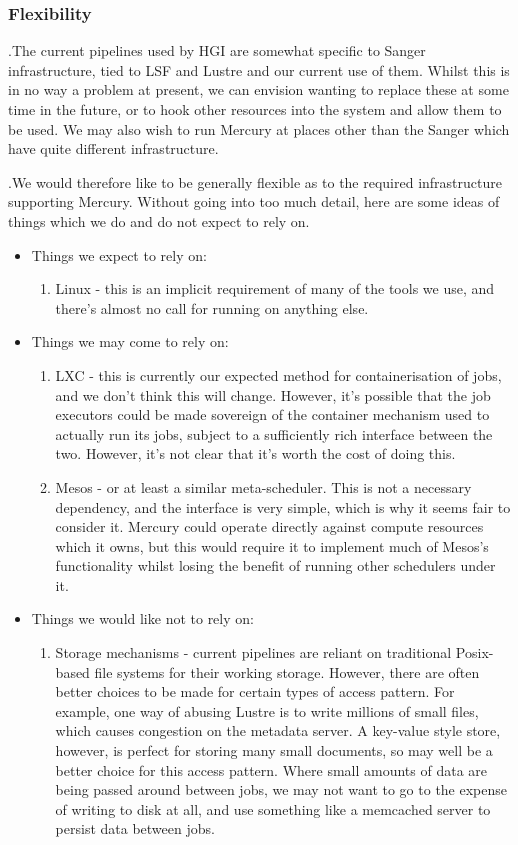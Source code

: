 \documentclass[10pt,a4paper]{article}
\newcounter{paracounter}
\newcommand{\npar}{\par\noindent\refstepcounter{paracounter}\theparacounter.\space}
\begin{document}
\subsubsection{Flexibility}
\label{sec:flexibility}
\npar The current pipelines used by HGI are somewhat specific to Sanger infrastructure, tied to LSF and Lustre and our current use of them. Whilst this is in no way a problem at present, we can envision wanting to replace these at some time in the future, or to hook other resources into the system and allow them to be used. We may also wish to run Mercury at places other than the Sanger which have quite different infrastructure.
\npar We would therefore like to be generally flexible as to the required infrastructure supporting Mercury. Without going into too much detail, here are some ideas of things which we do and do not expect to rely on.
\begin{itemize}
\item Things we expect to rely on:
\begin{enumerate}
\item Linux - this is an implicit requirement of many of the tools we use, and there's almost no call for running on anything else.
\end{enumerate}
\item Things we may come to rely on:
\begin{enumerate}
\item LXC - this is currently our expected method for containerisation of jobs, and we don't think this will change. However, it's possible that the \glspl{job executor} could be made sovereign of the container mechanism used to actually run its jobs, subject to a sufficiently rich interface between the two. However, it's not clear that it's worth the cost of doing this.
\item Mesos - or at least a similar meta-scheduler. This is not a necessary dependency, and the interface is very simple, which is why it seems fair to consider it. Mercury could operate directly against compute resources which it owns, but this would require it to implement much of Mesos's functionality whilst losing the benefit of running other schedulers under it.
\end{enumerate}
\item Things we would like not to rely on:
\begin{enumerate}
\item Storage mechanisms - current pipelines are reliant on traditional Posix-based file systems for their working storage. However, there are often better choices to be made for certain types of access pattern. For example, one way of abusing Lustre is to write millions of small files, which causes congestion on the metadata server. A key-value style store, however, is perfect for storing many small documents, so may well be a better choice for this access pattern. Where small amounts of data are being passed around between jobs, we may not want to go to the expense of writing to disk at all, and use something like a memcached server to persist data between jobs.


\end{enumerate}
\end{itemize}
\end{document}
